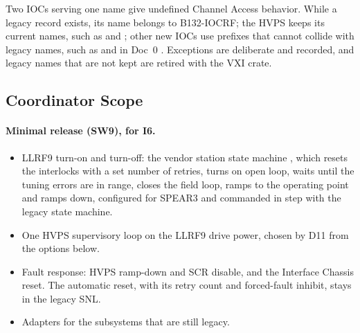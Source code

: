 Two IOCs serving one name give undefined Channel Access behavior. While a legacy record
exists, its name belongs to \mbox{B132-IOCRF}; the HVPS keeps its current names, such
as  and  ; other new IOCs
use prefixes that cannot collide with legacy names, such as  and
 in Doc~0 . Exceptions are deliberate and recorded, and legacy
names that are not kept are retired with the VXI crate.

\subsection{Coordinator Scope}\label{sec:coordinator}

\paragraph{Minimal release (SW9), for I6.}
\begin{itemize}
\item LLRF9 turn-on and turn-off: the vendor station state machine , which
resets the interlocks with a set number of retries, turns on open loop, waits until
the tuning errors are in range, closes the field loop, ramps to the operating point and
ramps down, configured for SPEAR3 and commanded in step with the legacy state machine.
\item One HVPS supervisory loop on the LLRF9 drive power, chosen by D11 from the
options below.
\item Fault response: HVPS ramp-down and SCR disable, and the Interface Chassis reset.
The automatic reset, with its retry count and forced-fault inhibit, stays in the
legacy SNL.
\item Adapters for the subsystems that are still legacy.
\end{itemize}


